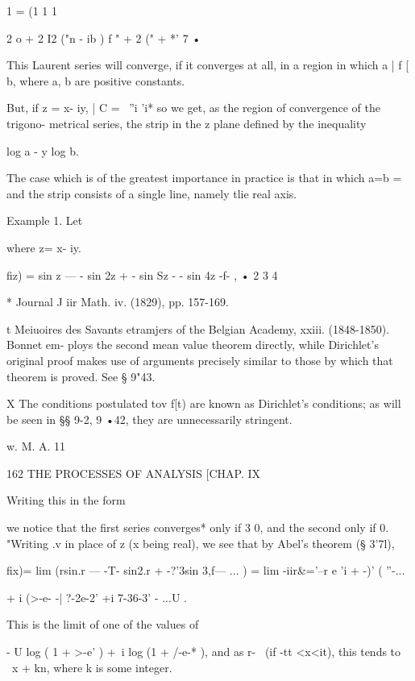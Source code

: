 1 =  (1 1 1 

2  o +  2  I2 ("n - ib ) f " + 2 ("  + *'    7 • 

This Laurent series will converge, if it converges at all, in a region in which a   | f [  b, 
where a, b are positive constants. 

But, if z = x- iy, | C = ~''i  'i*  so we get, as the region of convergence of the trigono- 
metrical series, the strip in the z plane defined by the inequality 

log a - y   log b. 

The case which is of the greatest importance in practice is that in which a=b = \, and 
the strip consists of a single line, namely tlie real axis. 

Example 1. Let 



where z= x- iy. 



fiz) = sin z — - sin 2z + - sin Sz - - sin 4z -f- , 
•    2 3 4 



* Journal J iir Math. iv. (1829), pp. 157-169. 

t Meiuoires des Savants etramjers of the Belgian Academy, xxiii. (1848-1850). Bonnet em- 
ploys the second mean value theorem directly, while Dirichlet's original proof makes use of 
arguments precisely similar to those by which that theorem is proved. See § 9"43. 

X The conditions postulated tov f[t) are known as Dirichlet's conditions; as will be seen in 
§§ 9-2, 9 •42, they are unnecessarily stringent. 

w. M. A. 11 



162 THE PROCESSES OF ANALYSIS [CHAP. IX 

Writing this in the form 

we notice that the first series converges* only if 3  0, and the second only if  0. 
"Writing .v in place of z (x being real), we see that by Abel's theorem (§ 3'7l), 

fix)= lim (rsin.r — -T-  sin2.r + -?'3sin 3,f— ... ) 
= lim  -iir\&='--r e 'i  + -)' ( ''-...\ 

+   i (>-e- -| ?-2e-2' +i 7-36-3' - ...U . 

This is the limit of one of the values of 

- U log ( 1 + >-e' ) +\ i log (1 + /-e-* ), 
and as r- \ (if -tt <x<it), this tends to \ x + kn, where k is some integer. 

